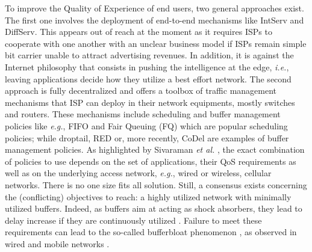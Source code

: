 \documentclass[preprint,12pt]{elsarticle}
\begin{document}
To improve the Quality of Experience of end users, two general approaches exist. The first one involves the deployment of end-to-end mechanisms like IntServ and DiffServ.  This appears out of reach at the moment as it requires ISPs to cooperate with one another with an unclear business model if ISPs remain simple bit carrier unable to attract advertising revenues. In addition, it is against the Internet philosophy that consists in pushing the intelligence at the edge, \textit{i.e.}, leaving applications decide how they utilize a best effort network. The second approach is fully decentralized and offers a toolbox of traffic management mechanisms that ISP can deploy in their network equipments, mostly switches and routers.  These mechanisms include  scheduling and buffer management policies like \textit{e.g.}, FIFO and Fair Queuing (FQ) which are popular scheduling policies; while droptail, RED \cite{Floyd93} or, more recently, CoDel \cite{Jacobson12} are examples of buffer management policies. As highlighted by Sivaraman \textit{et al.} \cite{sivaraman2013no}, the exact combination of policies to use depends on the set of applications, their QoS requirements as well as on the underlying access network, \textit{e.g.}, wired or wireless, cellular networks. There is no one size fits all solution. Still, a consensus exists concerning the (conflicting) objectives to reach: a highly utilized network with minimally utilized buffers. Indeed, as buffers aim at acting as shock absorbers, they lead to delay increase if they are continuously utilized \cite{Jacobson12}. Failure to meet these requirements can lead to the so-called bufferbloat phenomenon \cite{Gettys12}, as observed in wired and mobile networks \cite{BufferBloat_IMC_2012}.
\end{document}
